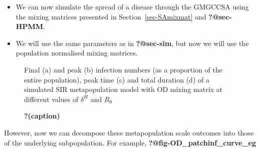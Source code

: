 \documentclass[
  letterpaper,
  DIV=11,
  numbers=noendperiod]{scrartcl}
\providecommand{\tightlist}{%
  \setlength{\itemsep}{0pt}\setlength{\parskip}{0pt}}\usepackage{longtable,booktabs,array}
\begin{document}
\begin{itemize}
\tightlist
\item
  We can now simulate the spread of a disease through the GMGCCSA using
  the mixing matrices presented in Section~\ref{sec-SAmixmat} and
  \textbf{?@sec-HPMM}.
\item
  We will use the same parameters as in \textbf{?@sec-sim}, but now we
  will use the population normalised mixing matrices.
\end{itemize}

\begin{figure}

\begin{minipage}[t]{0.50\linewidth}

{\centering 

Final (a) and peak (b) infection numbers (as a proportion of the entire
population), peak time (c) and total duration (d) of a simulated SIR
metapopulation model with OD mixing matrix at different values of
\(\delta^H\) and \(R_0\)

}

\end{minipage}%

\caption{\label{fig-SA3_OD_outcomes}\textbf{?(caption)}}

\end{figure}

However, now we can decompose these metapopulation scale outcomes into
those of the underlying subpopulation. For example,
\textbf{?@fig-OD\_patchinf\_curve\_eg}
\end{document}
